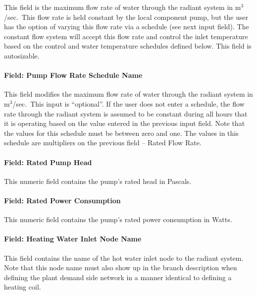 This field is the maximum flow rate of water through the radiant system in m\(^{3}\)/sec.~This flow rate is held constant by the local component pump, but the user has the option of varying this flow rate via a schedule (see next input field). The constant flow system will accept this flow rate and control the inlet temperature based on the control and water temperature schedules defined below. This field is autosizable.

\paragraph{Field: Pump Flow Rate Schedule Name}\label{field-pump-flow-rate-schedule-name-001}

This field modifies the maximum flow rate of water through the radiant system in m\(^{3}\)/sec.~This input is ``optional''. If the user does not enter a schedule, the flow rate through the radiant system is assumed to be constant during all hours that it is operating based on the value entered in the previous input field. Note that the values for this schedule must be between zero and one. The values in this schedule are multipliers on the previous field -- Rated Flow Rate.

\paragraph{Field: Rated Pump Head}\label{field-rated-pump-head}

This numeric field contains the pump's rated head in Pascals.

\paragraph{Field: Rated Power Consumption}\label{field-rated-power-consumption-000}

This numeric field contains the pump's rated power consumption in Watts.

\paragraph{Field: Heating Water Inlet Node Name}\label{field-heating-water-inlet-node-name-1}

This field contains the name of the hot water inlet node to the radiant system. Note that this node name must also show up in the branch description when defining the plant demand side network in a manner identical to defining a heating coil.

